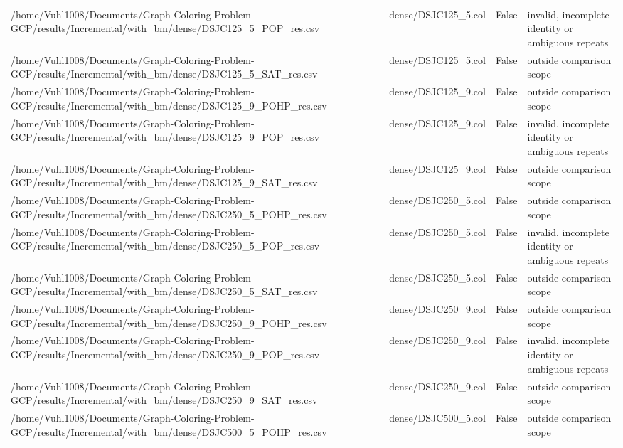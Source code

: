 \begin{table}[htbp]
\begin{tabular}{llll}
/home/Vuhl1008/Documents/Graph-Coloring-Problem-GCP/results/Incremental/with\_bm/dense/DSJC125\_5\_POP\_res.csv & dense/DSJC125\_5.col & False & invalid, incomplete identity or ambiguous repeats \\
/home/Vuhl1008/Documents/Graph-Coloring-Problem-GCP/results/Incremental/with\_bm/dense/DSJC125\_5\_SAT\_res.csv & dense/DSJC125\_5.col & False & outside comparison scope \\
/home/Vuhl1008/Documents/Graph-Coloring-Problem-GCP/results/Incremental/with\_bm/dense/DSJC125\_9\_POHP\_res.csv & dense/DSJC125\_9.col & False & outside comparison scope \\
/home/Vuhl1008/Documents/Graph-Coloring-Problem-GCP/results/Incremental/with\_bm/dense/DSJC125\_9\_POP\_res.csv & dense/DSJC125\_9.col & False & invalid, incomplete identity or ambiguous repeats \\
/home/Vuhl1008/Documents/Graph-Coloring-Problem-GCP/results/Incremental/with\_bm/dense/DSJC125\_9\_SAT\_res.csv & dense/DSJC125\_9.col & False & outside comparison scope \\
/home/Vuhl1008/Documents/Graph-Coloring-Problem-GCP/results/Incremental/with\_bm/dense/DSJC250\_5\_POHP\_res.csv & dense/DSJC250\_5.col & False & outside comparison scope \\
/home/Vuhl1008/Documents/Graph-Coloring-Problem-GCP/results/Incremental/with\_bm/dense/DSJC250\_5\_POP\_res.csv & dense/DSJC250\_5.col & False & invalid, incomplete identity or ambiguous repeats \\
/home/Vuhl1008/Documents/Graph-Coloring-Problem-GCP/results/Incremental/with\_bm/dense/DSJC250\_5\_SAT\_res.csv & dense/DSJC250\_5.col & False & outside comparison scope \\
/home/Vuhl1008/Documents/Graph-Coloring-Problem-GCP/results/Incremental/with\_bm/dense/DSJC250\_9\_POHP\_res.csv & dense/DSJC250\_9.col & False & outside comparison scope \\
/home/Vuhl1008/Documents/Graph-Coloring-Problem-GCP/results/Incremental/with\_bm/dense/DSJC250\_9\_POP\_res.csv & dense/DSJC250\_9.col & False & invalid, incomplete identity or ambiguous repeats \\
/home/Vuhl1008/Documents/Graph-Coloring-Problem-GCP/results/Incremental/with\_bm/dense/DSJC250\_9\_SAT\_res.csv & dense/DSJC250\_9.col & False & outside comparison scope \\
/home/Vuhl1008/Documents/Graph-Coloring-Problem-GCP/results/Incremental/with\_bm/dense/DSJC500\_5\_POHP\_res.csv & dense/DSJC500\_5.col & False & outside comparison scope \\

\end{tabular}
\end{table}
